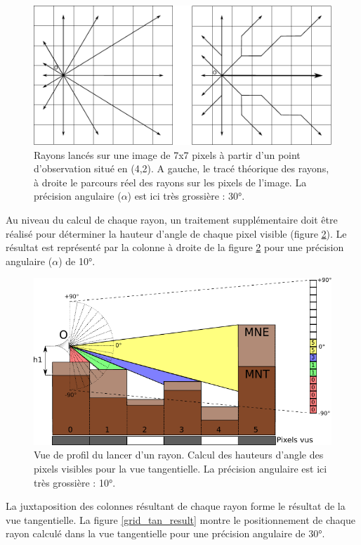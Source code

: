 \documentclass{report}
\begin{document}
\begin{figure}[H]
	\includegraphics[scale=0.8]{img/grid_tan.pdf} 
	\caption{Rayons lancés sur une image de 7x7 pixels à partir d'un point d'observation situé en (4,2). A gauche, le tracé théorique des rayons, à droite le parcours réel des rayons sur les pixels de l'image. La précision angulaire ($\alpha$) est ici très grossière : 30°.}
	\label{grid_tan}
\end{figure}


Au niveau du calcul de chaque rayon, un traitement supplémentaire doit être réalisé pour déterminer la hauteur d'angle de chaque pixel visible (figure \ref{ray_side_tan}). Le résultat est représenté par la colonne à droite de la figure \ref{ray_side_tan} pour une précision angulaire ($\alpha$) de 10°.

\begin{figure}[H]
	\includegraphics{img/ray_side_tan-fr.pdf} 
	\caption{Vue de profil du lancer d'un rayon. Calcul des hauteurs d'angle des pixels visibles pour la vue tangentielle. La précision angulaire est ici très grossière : 10°.}
	\label{ray_side_tan}
\end{figure}

La juxtaposition des colonnes résultant de chaque rayon forme le résultat de la vue tangentielle. La figure \ref{grid_tan_result} montre le positionnement de chaque rayon calculé dans la vue tangentielle pour une précision angulaire de 30°.
\end{document}

